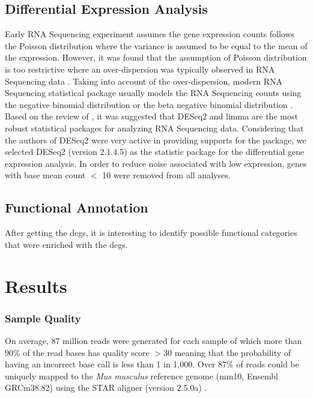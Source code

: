 \subsection{Differential Expression Analysis}
Early RNA Sequencing experiment assumes the gene expression counts follows the Poisson distribution \citep{Marioni2008} where the variance is assumed to be equal to the mean of the expression.
However, it was found that the assumption of Poisson distribution is too restrictive where an over-dispersion was typically observed in RNA Sequencing data \citep{Anders2010}.
Taking into account of the over-dispersion, modern RNA Sequencing statistical package usually models the RNA Sequencing counts using the negative binomial distribution \citep{Anders2010,Robinson2010} or the beta negative binomial distribution \citep{Trapnell2012}.
Based on the review of \citet{Seyednasrollah2015}, it was suggested that DESeq2 and limma are the most robust statistical packages for analyzing RNA Sequencing data. 
Considering that the authors of DESeq2 were very active in providing supports for the package, we selected DESeq2 (version 2.1.4.5) \citep{Love2014} as the statistic package for the differential gene expression analysis.
In order to reduce noise associated with low expression, genes with base mean count $<$ 10 were removed from all analyses. 


\subsection{Functional Annotation}
After getting the \glspl{deg}, it is interesting to identify possible functional categories that were enriched with the \glspl{deg}.

\section{Results} 
\underline{}\subsubsection{Sample Quality}
On average, 87 million reads were generated for each sample of which more than 90\% of the read bases has quality score $>30$ meaning that the probability of having an incorrect base call is less than 1 in 1,000.
Over 87\% of reads could be uniquely mapped to the \textit{Mus musculus} reference genome (mm10, Ensembl GRCm38.82) using the STAR aligner (version 2.5.0a) \citep{Dobin2013}.

